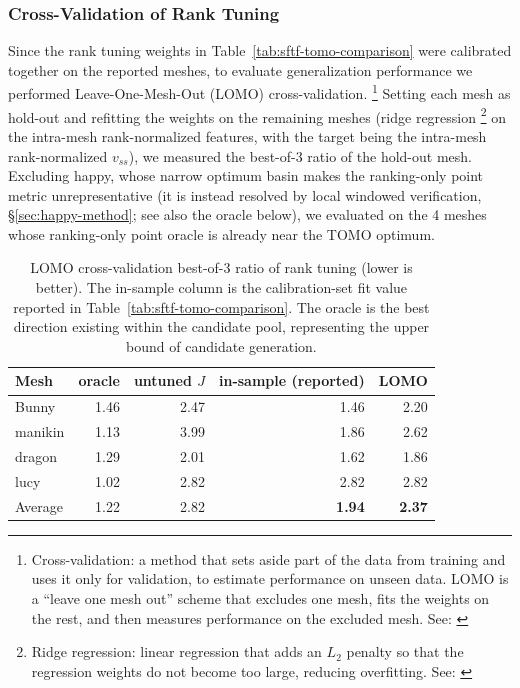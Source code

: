 \documentclass[11pt,a4paper]{article}
\begin{document}
\subsubsection{Cross-Validation of Rank Tuning}
\label{sec:cv}

Since the rank tuning weights in Table~\ref{tab:sftf-tomo-comparison} were calibrated together on the reported meshes,
to evaluate generalization performance we performed Leave-One-Mesh-Out (LOMO) cross-validation.%
\footnote{Cross-validation: a method that sets aside part of the data from training and uses it only for validation, to estimate performance
on unseen data. LOMO is a ``leave one mesh out'' scheme that excludes one mesh, fits the weights on the rest, and then measures performance
on the excluded mesh. See: \cite{stone1974}}
Setting each mesh as hold-out and refitting the weights on the remaining meshes
(ridge regression%
\footnote{Ridge regression: linear regression that adds an $L_2$ penalty so that the regression weights do not become too large,
reducing overfitting. See: \cite{hoerl1970}} on the intra-mesh rank-normalized features, with the target being the intra-mesh rank-normalized $v_{ss}$),
we measured the best-of-3 ratio of the hold-out mesh.
Excluding happy, whose narrow optimum basin makes the ranking-only point metric unrepresentative (it is instead
resolved by local windowed verification, \S\ref{sec:happy-method}; see also the oracle below),
we evaluated on the 4 meshes whose ranking-only point oracle is already near the TOMO optimum.

\begin{table}[H]
\centering
\caption{LOMO cross-validation best-of-3 ratio of rank tuning (lower is better).
The in-sample column is the calibration-set fit value reported in Table~\ref{tab:sftf-tomo-comparison}.
The oracle is the best direction existing within the candidate pool, representing the upper bound of candidate generation.}
\label{tab:lomo-cv}
\begin{tabular}{lrrrr}
\toprule
Mesh & oracle & untuned $J$ & in-sample (reported) & LOMO\\
\midrule
Bunny    & 1.46 & 2.47 & 1.46 & 2.20\\
manikin  & 1.13 & 3.99 & 1.86 & 2.62\\
dragon   & 1.29 & 2.01 & 1.62 & 1.86\\
lucy     & 1.02 & 2.82 & 2.82 & 2.82\\
\midrule
Average     & 1.22 & 2.82 & \textbf{1.94} & \textbf{2.37}\\
\bottomrule
\end{tabular}
\end{table}
\end{document}
